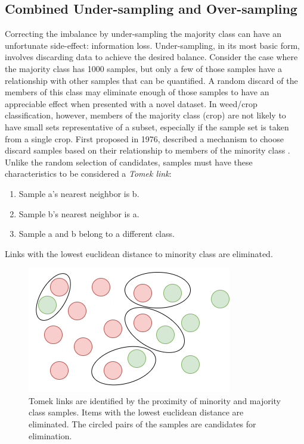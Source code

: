\documentclass[letterpaper, notitlepage]{report}
\begin{document}
\subsection{Combined Under-sampling and Over-sampling}
\label{section:under}
Correcting the imbalance by under-sampling the majority class can have an unfortunate side-effect: information loss. Under-sampling, in its most basic form, involves discarding data to achieve the desired balance. Consider the case where the majority class has 1000 samples, but only a few of those samples have a relationship with other samples that can be quantified. A random discard of the members of this class may eliminate enough of those samples to have an appreciable effect when presented with a novel dataset. In weed/crop classification, however, members of the majority class (crop) are not likely to have small sets representative of a subset, especially if the sample set is taken from a single crop.
First proposed in 1976, \citeauthor{Tomek1976-bg} described a mechanism to choose discard samples based on their relationship to members of the minority class \parencite{Tomek1976-bg}. Unlike the random selection of candidates, samples must have these characteristics to be considered a \textit{Tomek link}:
\begin{enumerate}
\item{Sample a’s nearest neighbor is b.}
\item{Sample b’s nearest neighbor is a.}
\item{Sample a and b belong to a different class.}
\end{enumerate}
Links with the lowest euclidean distance to  minority class are eliminated.
\begin{figure}[H]
	\centering
	\includegraphics[scale=0.30]{./figures/tomek-a.png}
	\caption[Tomek links]{Tomek links are identified by the proximity of minority and majority class samples. Items with the lowest euclidean distance are eliminated. The circled pairs of the samples are candidates for elimination.}
	\label{fig:tomek}
\end{figure}
\end{document}
